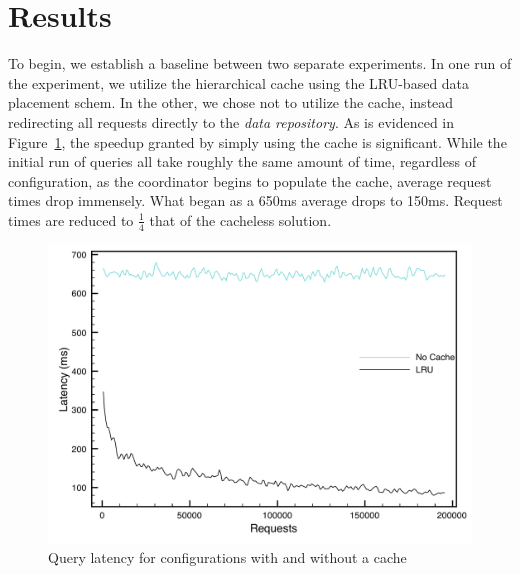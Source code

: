 
\section{Results} %
\label{sec:results_storage}
To begin, we establish a baseline between two separate experiments. In one run
of the experiment, we utilize the hierarchical cache using the LRU-based data
placement schem. In the other, we chose not to utilize the cache, instead
redirecting all requests directly to the \emph{data repository}. As is
evidenced in Figure~\ref{fig:hierarchy-latency-nocache}, the speedup granted by
simply using the cache is significant. While the initial run of queries all
take roughly the same amount of time, regardless of configuration, as the
coordinator begins to populate the cache, average request times drop immensely.
What began as a 650ms average drops to 150ms. Request times are reduced to
$\frac{1}{4}$ that of the cacheless solution.

\begin{figure}
\begin{center}
\includegraphics[scale=0.5]{figures/hierarchy-latency-nocache.pdf}
\end{center}
\caption{Query latency for configurations with and without a cache}
\label{fig:hierarchy-latency-nocache}
\end{figure}

